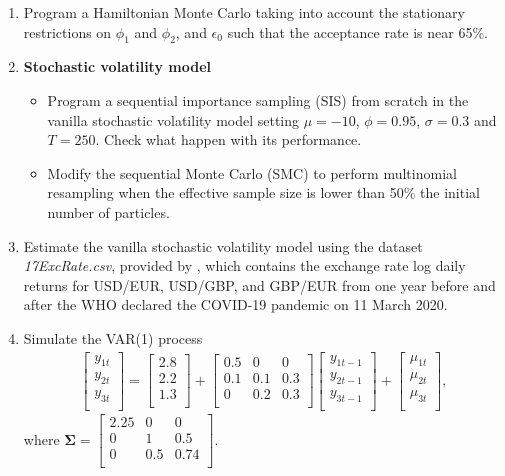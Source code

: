 \begin{enumerate}
	\item Program a Hamiltonian Monte Carlo taking into account the stationary restrictions on $\phi_1$ and $\phi_2$, and $\epsilon_0$ such that the acceptance rate is near 65\%. 
	
	\item \textbf{Stochastic volatility model}
	\begin{itemize}
		\item Program a sequential importance sampling (SIS) from scratch in the vanilla stochastic volatility model setting $\mu=-10$, $\phi = 0.95$, $\sigma=0.3$ and $T=250$. Check what happen with its performance.
		\item Modify the sequential Monte Carlo (SMC) to perform multinomial resampling when the effective sample size is lower than 50\% the initial number of particles.  
	\end{itemize}

	\item Estimate the vanilla stochastic volatility model using the dataset \textit{17ExcRate.csv}, provided by \cite{ramirez2024testing}, which contains the exchange rate log daily returns for USD/EUR, USD/GBP, and GBP/EUR from one year before and after the WHO declared the COVID-19 pandemic on 11 March 2020.
		
	\item Simulate the VAR(1) process
	\begin{align*}
		\begin{bmatrix}
			y_{1t}\\
			y_{2t}\\
			y_{3t}\\
		\end{bmatrix} = \begin{bmatrix}
			2.8\\
			2.2\\
			1.3\\
		\end{bmatrix} + \begin{bmatrix}
			0.5 & 0 & 0\\
			0.1 & 0.1 & 0.3\\
			0 & 0.2 & 0.3\\
		\end{bmatrix} \begin{bmatrix}
			y_{1t-1}\\
			y_{2t-1}\\
			y_{3t-1}\\
		\end{bmatrix} +\begin{bmatrix}
			\mu_{1t}\\
			\mu_{2t}\\
			\mu_{3t}\\
		\end{bmatrix},
	\end{align*}
	where $\bm{\Sigma}= \begin{bmatrix}
		2.25 & 0 & 0\\
		0 & 1 & 0.5\\
		0 & 0.5 & 0.74\\
	\end{bmatrix}$.


\end{enumerate}
